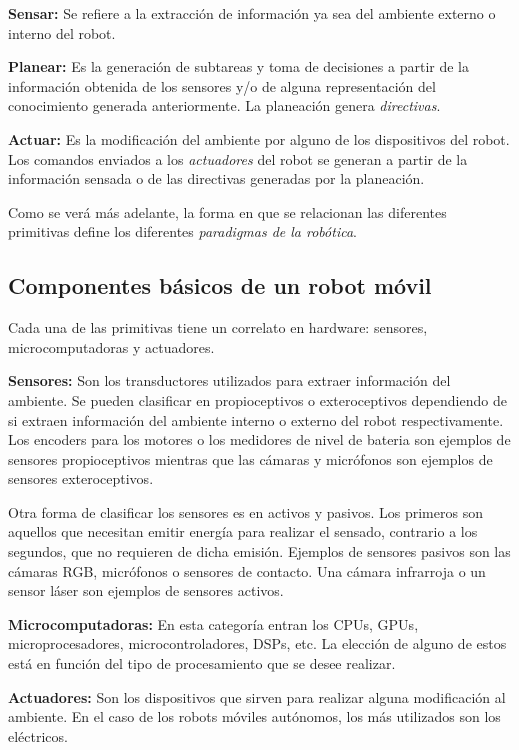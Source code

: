 \documentclass[a4paper]{article}
\begin{document}
\textbf{Sensar:} Se refiere a la extracción de información ya sea del ambiente externo o interno del robot. 

\textbf{Planear:} Es la generación de subtareas y toma de decisiones a partir de la información obtenida de los sensores y/o de alguna representación del conocimiento generada anteriormente. La planeación genera \textit{directivas}.

\textbf{Actuar:} Es la modificación del ambiente por alguno de los dispositivos del robot. Los comandos enviados a los \textit{actuadores} del robot se generan a partir de la información sensada o de las directivas generadas por la planeación. 

Como se verá más adelante, la forma en que se relacionan las diferentes primitivas define los diferentes \textit{paradigmas de la robótica}.

\subsection{Componentes básicos de un robot móvil}
Cada una de las primitivas tiene un correlato en hardware: sensores, microcomputadoras y actuadores. 

\textbf{Sensores:} Son los transductores utilizados para extraer información del ambiente. Se pueden clasificar en propioceptivos o exteroceptivos dependiendo de si extraen información del ambiente interno o externo del robot respectivamente. Los encoders para los motores o los medidores de nivel de bateria son ejemplos de sensores propioceptivos mientras que las cámaras y micrófonos son ejemplos de sensores exteroceptivos. 

Otra forma de clasificar los sensores es en activos y pasivos. Los primeros son aquellos que necesitan emitir energía para realizar el sensado, contrario a los segundos, que no requieren de dicha emisión. Ejemplos de sensores pasivos son las cámaras RGB, micrófonos o sensores de contacto. Una cámara infrarroja o un sensor láser son ejemplos de sensores activos. 

\textbf{Microcomputadoras:} En esta categoría entran los CPUs, GPUs, microprocesadores, microcontroladores, DSPs, etc. La elección de alguno de estos está en función del tipo de procesamiento que se desee realizar.

\textbf{Actuadores:} Son los dispositivos que sirven para realizar alguna modificación al ambiente. En el caso de los robots móviles autónomos, los más utilizados son los eléctricos. 
\end{document}

